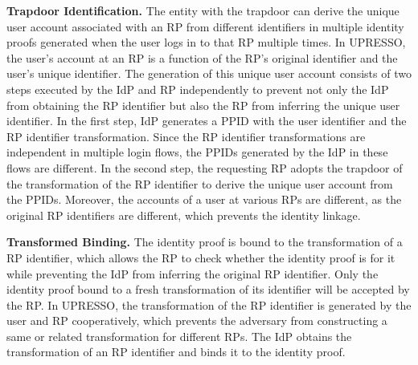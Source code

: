 \vspace{1mm}\noindent \textbf{Trapdoor Identification.} The entity with the trapdoor can derive the unique user account associated with an RP from different identifiers in multiple identity proofs generated when the user logs in to that RP multiple times.
In UPRESSO, the user's account at an RP is a function of the RP's original identifier and the user's unique identifier.
The generation of this unique user account consists of two steps executed by the IdP and RP independently to prevent not only the IdP from obtaining the RP identifier but also the RP from inferring the unique user identifier.
In the first step, IdP generates a PPID with the user identifier and the RP identifier transformation. Since the RP identifier transformations are independent in multiple login flows, the PPIDs generated by the IdP in these flows are different.
In the second step, the requesting RP adopts the trapdoor of the transformation of the RP identifier to derive the unique user account from the PPIDs. Moreover, the accounts of a user at various RPs are different, as the original RP identifiers are different, which prevents the identity linkage.

\vspace{1mm}\noindent \textbf{Transformed Binding.}
The identity proof is bound to the transformation of a RP identifier, which allows the RP to check whether the identity proof is for it while preventing the IdP from inferring the original RP identifier. Only the identity proof bound to a fresh transformation of its identifier will be accepted by the RP.
In UPRESSO, the transformation of the RP identifier is generated by the user and RP cooperatively, which prevents the adversary from constructing a same or related transformation for different RPs. The IdP obtains the transformation of an RP identifier and binds it to the identity proof.

